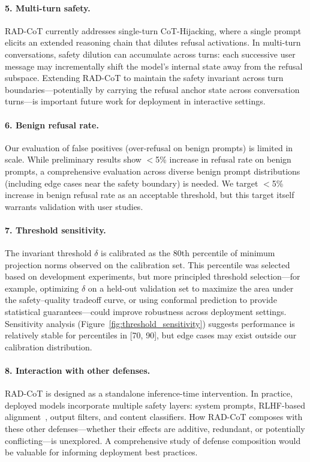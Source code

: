 \documentclass[11pt]{article}
\begin{document}
\paragraph{5. Multi-turn safety.}
RAD-CoT currently addresses single-turn CoT-Hijacking, where a single prompt elicits an extended reasoning chain that dilutes refusal activations. In multi-turn conversations, safety dilution can accumulate across turns: each successive user message may incrementally shift the model's internal state away from the refusal subspace. Extending RAD-CoT to maintain the safety invariant across turn boundaries---potentially by carrying the refusal anchor state across conversation turns---is important future work for deployment in interactive settings.

\paragraph{6. Benign refusal rate.}
Our evaluation of false positives (over-refusal on benign prompts) is limited in scale. While preliminary results show $<$5\% increase in refusal rate on benign prompts, a comprehensive evaluation across diverse benign prompt distributions (including edge cases near the safety boundary) is needed. We target $<$5\% increase in benign refusal rate as an acceptable threshold, but this target itself warrants validation with user studies.

\paragraph{7. Threshold sensitivity.}
The invariant threshold $\delta$ is calibrated as the 80th percentile of minimum projection norms observed on the calibration set. This percentile was selected based on development experiments, but more principled threshold selection---for example, optimizing $\delta$ on a held-out validation set to maximize the area under the safety--quality tradeoff curve, or using conformal prediction to provide statistical guarantees---could improve robustness across deployment settings. Sensitivity analysis (Figure~\ref{fig:threshold_sensitivity}) suggests performance is relatively stable for percentiles in [70, 90], but edge cases may exist outside our calibration distribution.

\paragraph{8. Interaction with other defenses.}
RAD-CoT is designed as a standalone inference-time intervention. In practice, deployed models incorporate multiple safety layers: system prompts, RLHF-based alignment~\citep{ouyang2022training, christiano2017deep}, output filters, and content classifiers. How RAD-CoT composes with these other defenses---whether their effects are additive, redundant, or potentially conflicting---is unexplored. A comprehensive study of defense composition would be valuable for informing deployment best practices.
\end{document}
